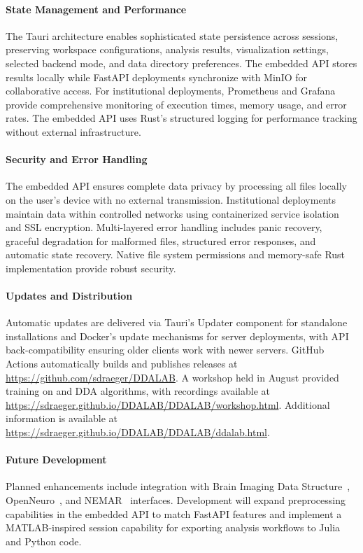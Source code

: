 \paragraph{State Management and Performance}
The Tauri architecture enables sophisticated state persistence across sessions, preserving workspace configurations, analysis results, visualization settings, selected backend mode, and data directory preferences. The embedded API stores results locally while FastAPI deployments synchronize with MinIO for collaborative access. For institutional deployments, Prometheus and Grafana provide comprehensive monitoring of execution times, memory usage, and error rates. The embedded API uses Rust's structured logging for performance tracking without external infrastructure.

\paragraph{Security and Error Handling}
The embedded API ensures complete data privacy by processing all files locally on the user's device with no external transmission. Institutional deployments maintain data within controlled networks using containerized service isolation and SSL encryption. Multi-layered error handling includes panic recovery, graceful degradation for malformed files, structured error responses, and automatic state recovery. Native file system permissions and memory-safe Rust implementation provide robust security.

\paragraph{Updates and Distribution}
Automatic updates are delivered via Tauri's Updater component for standalone installations and Docker's update mechanisms for server deployments, with API back-compatibility ensuring older clients work with newer servers. GitHub Actions automatically builds and publishes releases at \url{https://github.com/sdraeger/DDALAB}. A workshop held in August provided training on {\DDALAB} and DDA algorithms, with recordings available at \url{https://sdraeger.github.io/DDALAB/DDALAB/workshop.html}. Additional information is available at \url{https://sdraeger.github.io/DDALAB/DDALAB/ddalab.html}.

\paragraph{Future Development}
Planned enhancements include integration with Brain Imaging Data Structure~\cite{gorgolewski2016brain}, OpenNeuro~\cite{markiewicz2021openneuro}, and NEMAR~\cite{delorme2022nemar} interfaces. Development will expand preprocessing capabilities in the embedded API to match FastAPI features and implement a MATLAB-inspired session capability for exporting analysis workflows to Julia and Python code.
